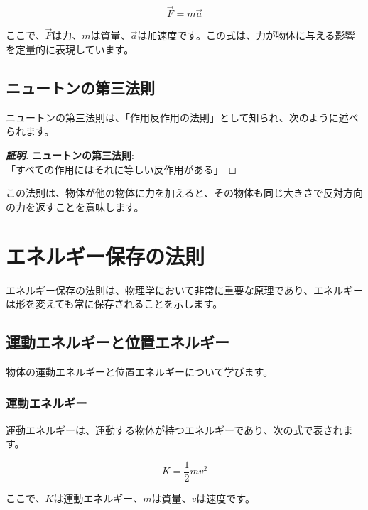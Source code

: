 \documentclass[
  11pt,
  a4paper]{ltjsarticle}
\begin{document}
\[
\vec{F} = m\vec{a}
\]

ここで、\(\vec{F}\)は力、\(m\)は質量、\(\vec{a}\)は加速度です。この式は、力が物体に与える影響を定量的に表現しています。

\subsection{ニュートンの第三法則}\label{ux30cbux30e5ux30fcux30c8ux30f3ux306eux7b2cux4e09ux6cd5ux5247}

ニュートンの第三法則は、「作用反作用の法則」として知られ、次のように述べられます。

\begin{proof}[\textbf{証明}]

\textbf{ニュートンの第三法則}:\\
「すべての作用にはそれに等しい反作用がある」

\end{proof}

この法則は、物体が他の物体に力を加えると、その物体も同じ大きさで反対方向の力を返すことを意味します。

\section{エネルギー保存の法則}\label{ux30a8ux30cdux30ebux30aeux30fcux4fddux5b58ux306eux6cd5ux5247}

エネルギー保存の法則は、物理学において非常に重要な原理であり、エネルギーは形を変えても常に保存されることを示します。

\subsection{運動エネルギーと位置エネルギー}\label{ux904bux52d5ux30a8ux30cdux30ebux30aeux30fcux3068ux4f4dux7f6eux30a8ux30cdux30ebux30aeux30fc}

物体の運動エネルギーと位置エネルギーについて学びます。

\subsubsection{運動エネルギー}\label{ux904bux52d5ux30a8ux30cdux30ebux30aeux30fc}

運動エネルギーは、運動する物体が持つエネルギーであり、次の式で表されます。

\[
K = \frac{1}{2}mv^2
\]

ここで、\(K\)は運動エネルギー、\(m\)は質量、\(v\)は速度です。
\end{document}
